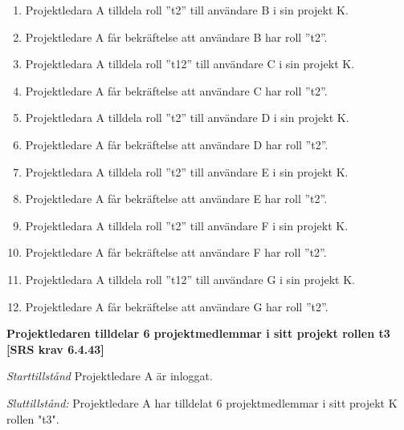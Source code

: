 \documentclass[a4paper]{article}
\begin{document}
\begin{FT}
\begin{enumerate}
\item Projektledara A tilldela roll ”t2” till användare B i sin projekt K. 
\item Projektledare A får bekräftelse att användare B har roll ”t2”.
\item Projektledara A tilldela roll ”t12” till användare C i sin projekt K. 
\item Projektledare A får bekräftelse att användare C har roll ”t2”.
\item Projektledara A tilldela roll ”t2” till användare D i sin projekt K. 
\item Projektledare A får bekräftelse att användare D har roll ”t2”.
\item Projektledara A tilldela roll ”t2” till användare E i sin projekt K. 
\item Projektledare A får bekräftelse att användare E har roll ”t2”.
\item Projektledara A tilldela roll ”t2” till användare F i sin projekt K. 
\item Projektledare A får bekräftelse att användare F har roll ”t2”.
\item Projektledara A tilldela roll ”t12” till användare G i sin projekt K. 
\item Projektledare A får bekräftelse att användare G har roll ”t2”.
\end{enumerate}

\item %
\textbf{Projektledaren tilldelar 6 projektmedlemmar i sitt projekt rollen t3 [SRS krav 6.4.43]}

\emph{Starttillstånd} Projektledare A är inloggat.

\emph{Sluttillstånd:} Projektledare A  har tilldelat 6 projektmedlemmar i sitt projekt K rollen "t3".


\end{FT}
\end{document}
